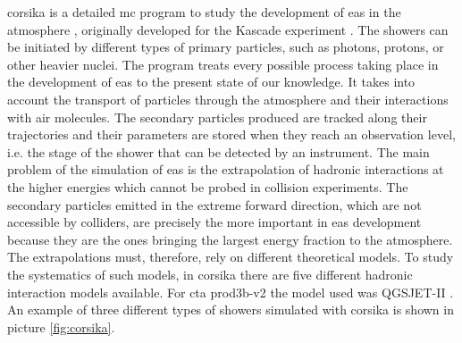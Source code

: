\documentclass[main.tex]{subfiles}
\begin{document}
\gls{corsika} is a detailed \gls{mc} program to study the development of \gls{eas} in the atmosphere \cite{1998Corsika}, originally developed for the Kascade experiment \cite{1997Kascade}. The showers can be initiated by different types of primary particles, such as photons, protons, or other heavier nuclei. The program treats every possible process taking place in the development of \gls{eas} to the present state of our knowledge. It takes into account the transport of particles through the atmosphere and their interactions with air molecules. The secondary particles produced are tracked along their trajectories and their parameters are stored when they reach an observation level, i.e. the stage of the shower that can be detected by an instrument. The main problem of the simulation of \gls{eas} is the extrapolation of hadronic interactions at the higher energies which cannot be probed in collision experiments. The secondary particles emitted in the extreme forward direction, which are not accessible by colliders, are precisely the more important in \gls{eas} development because they are the ones bringing the largest energy fraction to the atmosphere. The extrapolations must, therefore, rely on different theoretical models. To study the systematics of such models, in \gls{corsika} there are five different hadronic interaction models available. For \gls{cta} prod3b-v2 the model used was QGSJET-II \cite{2006QGSJET}. An example of three different types of showers simulated with \gls{corsika} is shown in picture \ref{fig:corsika}.
\end{document}
